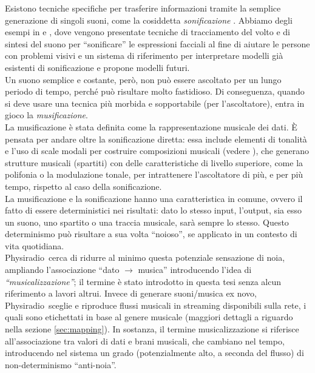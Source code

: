 \documentclass[12pt,a4paper]{report}
\newcommand{\physiradio}{Physiradio} %
\begin{document}
Esistono tecniche specifiche per trasferire informazioni tramite la semplice generazione di singoli suoni, come la cosiddetta \textit{sonificazione} \cite{sonificationNasaUrl}. Abbiamo degli esempi in \cite{bonafede2018proposal} e \cite{ludovico2016sonification}, dove vengono presentate tecniche di tracciamento del volto e di sintesi del suono per ``sonificare'' le espressioni facciali al fine di aiutare le persone con problemi visivi e un sistema di riferimento per interpretare modelli già esistenti di sonificazione e propone modelli futuri.\\
Un suono semplice e costante, però, non può essere ascoltato per un lungo periodo di tempo, perché può risultare molto fastidioso. Di conseguenza, quando si deve usare una tecnica più morbida e sopportabile (per l'ascoltatore), entra in gioco la \textit{musificazione}.\\
La musificazione è stata definita come la rappresentazione musicale dei dati. È pensata per andare oltre la sonificazione diretta: essa include elementi di tonalità e l'uso di scale modali per costruire composizioni musicali (vedere \cite{sonificationMusification}), che generano strutture musicali (spartiti) con delle caratteristiche di livello superiore, come la polifonia o la modulazione tonale, per intrattenere l'ascoltatore di più, e per più tempo, rispetto al caso della sonificazione.\\

La musificazione e la sonificazione hanno una caratteristica in comune, ovvero il fatto di essere deterministici nei risultati: dato lo stesso input, l'output, sia esso un suono, uno spartito o una traccia musicale, sarà sempre lo stesso. Questo determinismo può risultare a sua volta ``noioso'', se applicato in un contesto di vita quotidiana.\\
\physiradio\ cerca di ridurre al minimo questa potenziale sensazione di noia, ampliando l'associazione ``dato $\rightarrow$ musica'' introducendo l'idea di \textit{``musicalizzazione''}; il termine è stato introdotto in questa tesi senza alcun riferimento a lavori altrui.
Invece di generare suoni/musica ex novo, \physiradio\ sceglie e riproduce flussi musicali in streaming disponibili sulla rete, i quali sono etichettati in base al genere musicale (maggiori dettagli a riguardo nella sezione \ref{sec:mapping}).
In sostanza, il termine musicalizzazione si riferisce all'associazione tra valori di dati e brani musicali, che cambiano nel tempo, introducendo nel sistema un grado (potenzialmente alto, a seconda del flusso) di non-determinismo ``anti-noia''.
\end{document}
